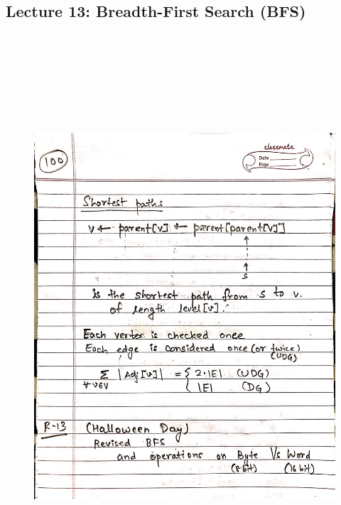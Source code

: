\newpage
{\color{black} \subsection*{Lecture 13: Breadth-First Search (BFS)}}
\begin{figure}[H]
    \centering
    \includegraphics[width=16cm, height=21cm]{"./MIT-6.006/MIT-6006-100"}
\end{figure}

